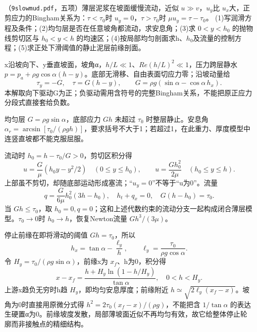 \begin{exercise}\label{task:fluid-slowmud}
（\texttt{9slowmud.pdf}，五项）薄层泥浆在坡面缓慢流动，近似 $u\gg v$，$u_y$比 $u_x$大，正剪应力的Bingham关系为：$\tau<\tau_0$时 $u_y=0$，$\tau>\tau_0$时 $\mu u_y=\tau-\tau_0$。
(1)写润滑方程及条件；(2)均匀层是否在任意坡角都流动，求安息角；(3)求 $0<y<h_0$ 的抛物线剪切区与 $h_0<y<h$ 的均速区；(4)按局部均匀剖面求h、$h_0$及流量的控制方程；(5)求正处下滑阈值的静止泥层前缘剖面。
\end{exercise}
\begin{solution}
x沿坡向下、y垂直坡面，坡角α，$h/L\ll1$、$Re(h/L)^2\ll1$，压力跨层静水 $p=p_a+\rho g\cos\alpha(h-y)$。底部无滑移、自由表面切应力零；沿坡动量给
\[
 \tau_y=-G,\quad\tau=G(h-y),\qquad
 G=\rho g(\sin\alpha-\cos\alpha\,h_x).
\]
本解取向下驱动G为正；负驱动需用含符号的完整Bingham关系，不能把原正应力分段式直接套给负数。

均匀层 $G=\rho g\sin\alpha$，底部应力 $Gh$ 未超过 $\tau_0$ 时整层静止。安息角 $\alpha_r=\arcsin[\tau_0/(\rho gh)]$，要求括号不大于1；若超过1，在此重力、厚度模型中连竖直坡都不能克服屈服。

流动时 $h_0=h-\tau_0/G>0$，剪切区积分得
\[
 u=\frac G\mu(h_0y-y^2/2)\quad(0\le y\le h_0),\qquad
 u=\frac{Gh_0^2}{2\mu}\quad(h_0\le y\le h).
\]
上部虽不剪切，却随底部运动形成塞流；“$u_y=0$”不等于“u为0”。流量
\[
 q=\frac{G}{6\mu}h_0^2(3h-h_0),\quad
 h_t+q_x=0,\quad G(h-h_0)=\tau_0.
\]
当 $Gh\le\tau_0$，取 $h_0=0,q=0$；这和上述代数约束的流动分支一起构成闭合薄层模型。$\tau_0\to0$时 $h_0\to h$，恢复Newton流量 $Gh^3/(3\mu)$。

停止前缘在即将滑动的阈值 $Gh=\tau_0$，所以
\[
 h_x=\tan\alpha-\frac{\ell_y}{h},\qquad
 \ell_y=\frac{\tau_0}{\rho g\cos\alpha}.
\]
令 $H_y=\tau_0/(\rho g\sin\alpha)$，前缘x为 $x_f$、h为0，积分得
\[
 x-x_f=\frac{h+H_y\ln(1-h/H_y)}{\tan\alpha},\quad0<h<H_y.
\]
上游x趋负无穷时h趋 $H_y$，即均匀安息厚度；前缘附近 $h\simeq\sqrt{2\ell_y(x_f-x)}$。坡角为0时直接用原微分式得 $h^2=2\tau_0(x_f-x)/(\rho g)$，不能把含 $1/\tan\alpha$ 的表达生硬置α为0。前缘坡度发散，局部薄坡面近似不再均匀有效，故它给整体停止轮廓而非接触点的精细结构。
\end{solution}

